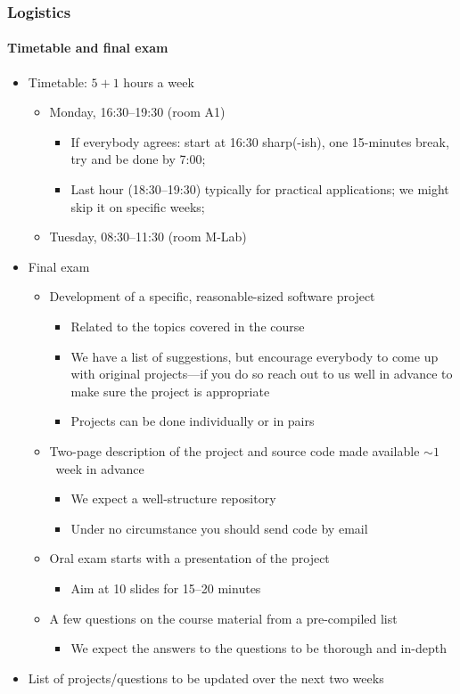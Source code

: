 \documentclass[9pt]{beamer}
\begin{document}
\begin{frame}
  \frametitle{Logistics}
  \framesubtitle{Timetable and final exam}
  \begin{itemize}
  \item Timetable: $5 + 1$ hours a week
    \begin{itemize}
    \item Monday, 16:30--19:30 (room A1)
      \begin{itemize}
        \item If everybody agrees: start at 16:30 sharp(-ish), one 15-minutes break,
          try and be done by 7:00;
        \item \alert{Last hour (18:30--19:30) typically for practical applications;
          we might skip it on specific weeks;}
      \end{itemize}
    \item Tuesday, 08:30--11:30 (room M-Lab)
    \end{itemize}
  \item Final exam
    \begin{itemize}
    \item Development of a specific, reasonable-sized software project
    \begin{itemize}
      \item Related to the topics covered in the course
      \item We have a list of suggestions, but encourage everybody to come up with
        original projects---\alert{if you do so reach out to us well in advance to make
        sure the project is appropriate}
      \item Projects can be done individually or in pairs
    \end{itemize}
    \item Two-page description of the project and source code made
      available $\sim 1$~week in advance
      \begin{itemize}
        \item We expect a well-structure repository
        \item \alert{Under no circumstance you should send code by email}
      \end{itemize}
    \item Oral exam starts with a presentation of the project
    \begin{itemize}
      \item Aim at 10 slides for 15--20 minutes
    \end{itemize}
    \item \alert{A few questions on the course material from a pre-compiled list}
    \begin{itemize}
      \item We expect the answers to the questions to be thorough and in-depth
    \end{itemize}
    \end{itemize}
    \item \alert{List of projects/questions to be updated over the next two weeks}
  \end{itemize}
\end{frame}
\end{document}
